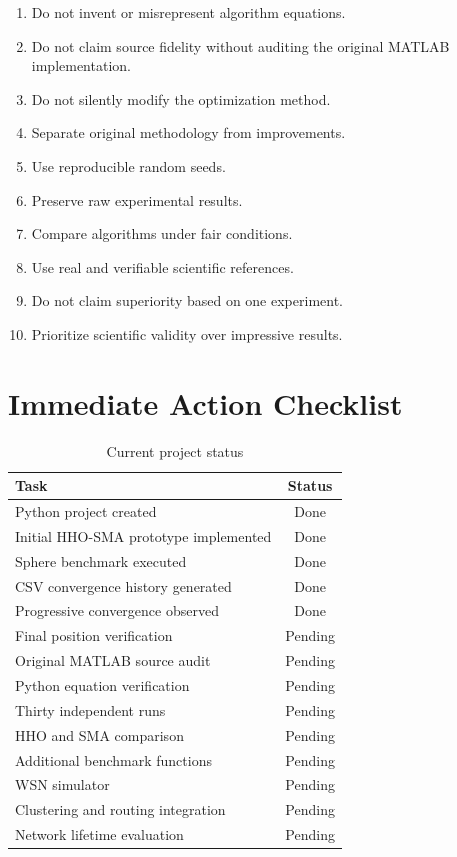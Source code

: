 \documentclass[12pt,a4paper]{report}
\begin{document}
\begin{enumerate}
    \item Do not invent or misrepresent algorithm equations.
    \item Do not claim source fidelity without auditing
    the original MATLAB implementation.
    \item Do not silently modify the optimization method.
    \item Separate original methodology from improvements.
    \item Use reproducible random seeds.
    \item Preserve raw experimental results.
    \item Compare algorithms under fair conditions.
    \item Use real and verifiable scientific references.
    \item Do not claim superiority based on one experiment.
    \item Prioritize scientific validity over impressive results.
\end{enumerate}

\chapter{Immediate Action Checklist}

\begin{table}[H]
\centering
\caption{Current project status}
\begin{tabular}{p{}c}
\toprule
\textbf{Task} & \textbf{Status}\\
\midrule
Python project created & Done\\
Initial HHO-SMA prototype implemented & Done\\
Sphere benchmark executed & Done\\
CSV convergence history generated & Done\\
Progressive convergence observed & Done\\
Final position verification & Pending\\
Original MATLAB source audit & Pending\\
Python equation verification & Pending\\
Thirty independent runs & Pending\\
HHO and SMA comparison & Pending\\
Additional benchmark functions & Pending\\
WSN simulator & Pending\\
Clustering and routing integration & Pending\\
Network lifetime evaluation & Pending\\
\bottomrule
\end{tabular}
\end{table}
\end{document}
